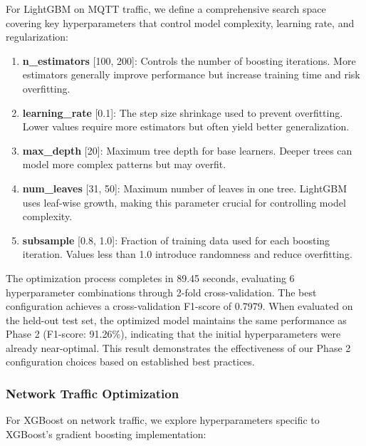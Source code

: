\documentclass[conference]{IEEEtran}
\begin{document}
For LightGBM on MQTT traffic, we define a comprehensive search space covering key hyperparameters that control model complexity, learning rate, and regularization:

\begin{enumerate}
\item \textbf{n\_estimators} [100, 200]: Controls the number of boosting iterations. More estimators generally improve performance but increase training time and risk overfitting.

\item \textbf{learning\_rate} [0.1]: The step size shrinkage used to prevent overfitting. Lower values require more estimators but often yield better generalization.

\item \textbf{max\_depth} [20]: Maximum tree depth for base learners. Deeper trees can model more complex patterns but may overfit.

\item \textbf{num\_leaves} [31, 50]: Maximum number of leaves in one tree. LightGBM uses leaf-wise growth, making this parameter crucial for controlling model complexity.

\item \textbf{subsample} [0.8, 1.0]: Fraction of training data used for each boosting iteration. Values less than 1.0 introduce randomness and reduce overfitting.
\end{enumerate}

The optimization process completes in 89.45 seconds, evaluating 6 hyperparameter combinations through 2-fold cross-validation. The best configuration achieves a cross-validation F1-score of 0.7979. When evaluated on the held-out test set, the optimized model maintains the same performance as Phase 2 (F1-score: 91.26\%), indicating that the initial hyperparameters were already near-optimal. This result demonstrates the effectiveness of our Phase 2 configuration choices based on established best practices.

\subsubsection{Network Traffic Optimization}

For XGBoost on network traffic, we explore hyperparameters specific to XGBoost's gradient boosting implementation:
\end{document}
